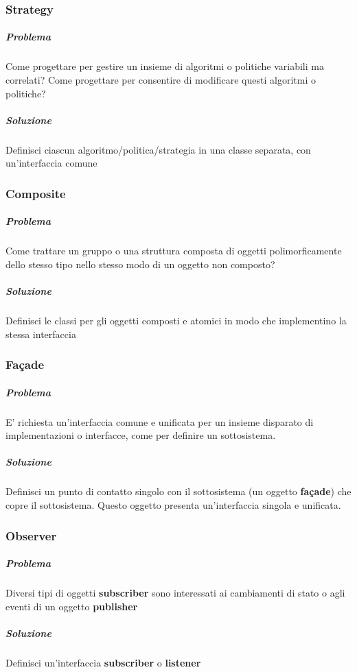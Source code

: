 \documentclass[12pt]{article}
\begin{document}
\subsubsection{Strategy}
\subparagraph{Problema} Come progettare per gestire un insieme di algoritmi o politiche variabili ma correlati? Come progettare per consentire di modificare questi algoritmi o politiche?
\subparagraph{Soluzione} Definisci ciascun algoritmo/politica/strategia in una classe separata, con un'interfaccia comune 
\subsubsection{Composite}
\subparagraph{Problema} Come trattare un gruppo o una struttura composta di oggetti polimorficamente dello stesso tipo nello stesso modo di un oggetto non composto?
\subparagraph{Soluzione} Definisci le classi per gli oggetti composti e atomici in modo che implementino la stessa interfaccia
\subsubsection{Façade}
\subparagraph{Problema} E' richiesta un'interfaccia comune e unificata per un insieme disparato di implementazioni o interfacce, come per definire un sottosistema.
\subparagraph{Soluzione} Definisci un punto di contatto singolo con il sottosistema (un oggetto \textbf{façade}) che copre il sottosistema. Questo oggetto presenta un'interfaccia singola e unificata.
\subsubsection{Observer}
\subparagraph{Problema} Diversi tipi di oggetti \textbf{subscriber} sono interessati ai cambiamenti di stato o agli eventi di un oggetto \textbf{publisher}
\subparagraph{Soluzione} Definisci un'interfaccia \textbf{subscriber} o \textbf{listener}
\end{document}
